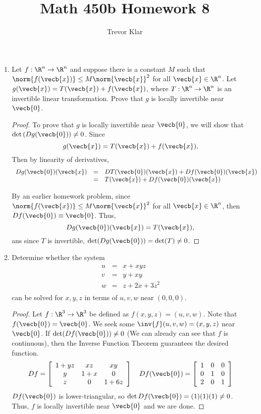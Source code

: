 \documentclass[letterpaper]{article}
\title{Math 450b \linebreak
Homework 8}
\author{Trevor Klar}
\begin{document}
\maketitle

\begin{enumerate}
\item Let $f:\R^n\to \R^n$ and suppose there is a constant $M$ such that $\norm{f(\vecb{x})}\leq M\norm{\vecb{x}}^2$ for all $\vecb{x}\in \R^n$. Let $g(\vecb{x})=T(\vecb{x})+f(\vecb{x})$, where $T:\R^n\to \R^n$ is an invertible linear transformation. Prove that $g$ is locally invertible near $\vecb{0} $. 
\begin{proof}
To prove that $g$ is locally invertible near $\vecb{0} $, we will show that $\det \left(Dg(\vecb{0})\right)\neq0$. Since
$$g(\vecb{x})=T(\vecb{x})+f(\vecb{x}),$$
Then by linearity of derivatives, 
\[\begin{array}{rcl}
Dg(\vecb{0})(\vecb{x})&=&DT(\vecb{0})(\vecb{x})+Df(\vecb{0})(\vecb{x})\\
&=&T(\vecb{x})+Df(\vecb{0})(\vecb{x})
\end{array}\]

By an earlier homework problem, since $\norm{f(\vecb{x})}\leq M\norm{\vecb{x}}^2$ for all $\vecb{x}\in \R^n$, then $Df(\vecb{0})\equiv\vecb{0}$. Thus, 
$$Dg(\vecb{0})(\vecb{x})=T(\vecb{x}),$$
ans since $T$ is invertible, $\det(Dg(\vecb{0}))=\det(T)\neq 0$. 
\end{proof}

\item Determine whether the system 
\[\begin{array}{rcl}
u &=& x+xyz\\
v &=& y+xy\\
w &=& z+2x+3z^2\\
\end{array}\]
can be solved for $x,y,z$ in terms of $u,v,w$ near $(0,0,0)$. 
\begin{proof}
Let $f:\R^3\to \R^3$ be defined as $f(x,y,z)=(u,v,w)$. Note that $f(\vecb{0})=\vecb{0}$. We seek some $\inv{f}(u,v,w)=(x,y,z)$ near $\vecb{0}$. If $\det(Df(\vecb{0}))\neq0$ (We can already can see that $f$ is continuous), then the Inverse Function Theorem guarantees the desired function. 
\[Df=\left[
\begin{array}{ccc}
1+yz & xz & xy\\
y & 1+x & 0\\
z & 0 & 1+6z\\
\end{array}\right]
\quad
Df(\vecb{0})=\left[
\begin{array}{ccc}
1&0&0\\
0&1&0\\
2&0&1\\
\end{array}\right]
\]
$Df(\vecb{0})$ is lower-triangular, so $\det Df(\vecb{0})=(1)(1)(1)\neq0$. Thus, $f$ is locally invertible near $\vecb{0}$ and we are done. 
\end{proof}


\end{enumerate}
\end{document}

